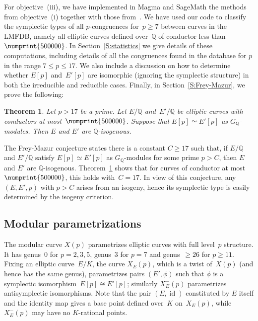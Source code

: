 \documentclass[12pt, reqno]{amsart}
\newcommand{\Q}{\mathbb{Q}}
\DeclareMathOperator{\id}{id}
\numberwithin{equation}{section}
\newtheorem{theorem}{Theorem}[section]
\theoremstyle{definition}
\theoremstyle{remark}
\newcommand{\Sage}{{\sc SageMath}}
\newcommand{\Magma}{{\sc Magma}}
\begin{document}
For objective~(iii), we have implemented in {\Magma} \cite{magma} and
{\Sage} \cite{sage} the methods from objective~(i) together with those
from~\cite{FKSym}. We have used our code to classify the symplectic
types of all $p$-congruences for~$p\ge7$ between curves in the LMFDB,
namely all elliptic curves defined over~$\Q$ of conductor less
than~$\numprint{500000}$.  In Section~\ref{S:statistics} we give
details of these computations, including details of all the
congruences found in the database for $p$ in the range $7 \leq p \leq
17$.  We also include a discussion on how to determine whether $E[p]$
and~$E'[p]$ are isomorphic (ignoring the symplectic structure) in both
the irreducible and reducible cases. Finally, in
Section~\ref{S:Frey-Mazur}, we prove the following:

\begin{theorem}%
 \label{T:cong19}
 Let $p > 17$ be a prime. Let $E/\Q$ and~$E'/\Q$ be elliptic curves
 with conductors at most~$\numprint{500000}$.  Suppose that $E[p]
 \simeq E'[p]$ as $G_\Q$-modules. Then $E$ and $E'$ are
 $\Q$-isogenous.
 \end{theorem}

The Frey-Mazur conjecture states there is a constant $C \geq 17$ such
that, if $E/\Q$ and $E'/\Q$ satisfy $E[p] \simeq E'[p]$ as
$G_\Q$-modules for some prime $p > C$, then $E$ and $E'$ are
$\Q$-isogenous. Theorem~\ref{T:cong19} shows that for curves of
conductor at most~$\numprint{500000}$, this holds with~$C=17$. In view
of this conjecture, any~$(E,E',p)$ with $p > C$ arises from an
isogeny, hence its symplectic type is easily determined by the isogeny
criterion.%



\subsection{Modular parametrizations}
The modular curve $X(p)$ parametrizes elliptic curves with full
level~$p$ structure. It has genus~$0$ for $p=2,3,5$, genus~$3$ for
$p=7$ and genus~$\ge26$ for $p\ge11$.  Fixing an elliptic
curve~$E/K$, the curve $X_E(p)$, which is a twist of~$X(p)$ (and
hence has the same genus), parametrizes pairs $(E',\phi)$ such that
$\phi$ is a symplectic isomorphism~$E[p]\cong E'[p]$; similarly
$X_E^-(p)$ parametrizes antisymplectic isomorphisms. Note that the pair $(E,\id)$ constituted by $E$ itself and the identity map
gives a base point defined over~$K$ on~$X_E(p)$, while $X_E^-(p)$ may have no $K$-rational points.
\end{document}
